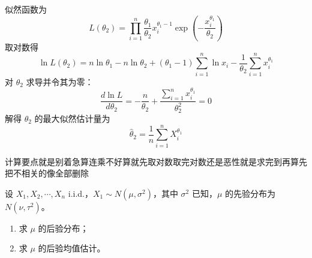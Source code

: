\begin{solution}
似然函数为
\[
L(\theta_2) = \prod_{i=1}^{n} \frac{\theta_1}{\theta_2} x_i^{\theta_1-1} \exp\!\left(-\frac{x_i^{\theta_1}}{\theta_2}\right)
\]
取对数得
\[
\ln L(\theta_2) = n\ln\theta_1 - n\ln\theta_2 + (\theta_1-1)\sum_{i=1}^n \ln x_i - \frac{1}{\theta_2}\sum_{i=1}^n x_i^{\theta_1}
\]
对 $\theta_2$ 求导并令其为零：
\[
\frac{d\ln L}{d\theta_2} = -\frac{n}{\theta_2} + \frac{\sum_{i=1}^n x_i^{\theta_1}}{\theta_2^2} = 0
\]
解得 $\theta_2$ 的最大似然估计量为
\[
\hat{\theta}_2 = \frac{1}{n}\sum_{i=1}^n X_i^{\theta_1}
\]
\end{solution}
\begin{dxtips}
    计算要点就是别着急算连乘不好算就先取对数取完对数还是恶性就是求完到再算先把不相关的像全部删除
\end{dxtips}
\begin{homework}[18]
设 \(X_1,X_2,\cdots,X_n\) i.i.d.，\(X_1\sim N(\mu,\sigma^2)\)，其中 \(\sigma^2\) 已知，\(\mu\) 的先验分布为 \(N(\nu,\tau^2)\)。

\begin{enumerate}
    \item 求 \(\mu\) 的后验分布；
    \item 求 \(\mu\) 的后验均值估计。
\end{enumerate}
\end{homework}

